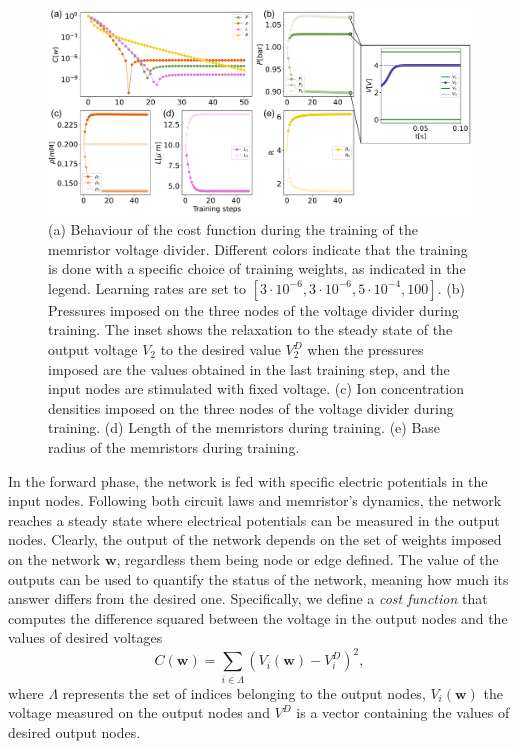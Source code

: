 \documentclass[reprint,superscriptaddress,prb,showkeys]{revtex4-2}
\newcommand{\brac}[1]{\left(#1 \right)} %
\begin{document}
\begin{figure}[t]
    \centering
    \includegraphics[width=1.7\columnwidth]{plots/voltage_divider/mse_weights_vd.pdf}
    \caption{(a) Behaviour of the cost function during the training of the memristor voltage divider. Different colors indicate that the training is done with a specific choice of training weights, as indicated in the legend. Learning rates are set to $[3\cdot 10^{-6}, 3\cdot 10^{-6}, 5\cdot 10^{-4}, 100]$. (b) Pressures imposed on the three nodes of the voltage divider during training. The inset shows the relaxation to the steady state of the output voltage $V_2$ to the desired value $V_2^D$ when the pressures imposed are the values obtained in the last training step, and the input nodes are stimulated with fixed voltage. (c) Ion concentration densities imposed on the three nodes of the voltage divider during training. (d) Length of the memristors during training. (e) Base radius of the memristors during training.}\label{fig:mse_weights_vd}
\end{figure} 
In the forward phase, the network is fed with specific electric potentials in the input nodes. Following both circuit laws and memristor's dynamics, the network reaches a steady state where electrical potentials can be measured in the output nodes. Clearly, the output of the network depends on the set of weights imposed on the network $\boldsymbol{w}$, regardless them being node or edge defined. The value of the outputs can be used to quantify the status of the network, meaning how much its answer differs from the desired one. Specifically, we define a \emph{cost function} that computes the difference squared between the voltage in the output nodes and the values of desired voltages
\[
C\left( \boldsymbol{w} \right) = \sum_{i \in \Lambda} \brac{V_i\brac{\boldsymbol{w}} - V_i^D}^2,
\label{eq:cost_func}
\]
where $\Lambda$ represents the set of indices belonging to the output nodes, $V_i\brac{\boldsymbol{w}}$ the voltage measured on the output nodes and $V^D$ is a vector containing the values of desired output nodes.
\end{document}
